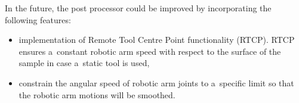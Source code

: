 In the future, the post processor could be improved by incorporating the following features:

\begin{itemize}

    \item implementation of Remote Tool Centre Point functionality (RTCP). RTCP ensures a~constant robotic arm speed with respect to the surface of the sample in case a~static tool is used,

    \item constrain the angular speed of robotic arm joints to a~specific limit so that the robotic arm motions will be smoothed.

\end{itemize}

